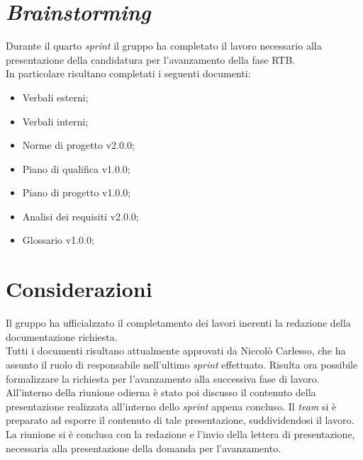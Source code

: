 \section{\textit{Brainstorming}}
Durante il quarto \textit{sprint} il gruppo ha completato il lavoro necessario alla presentazione della candidatura per l'avanzamento della fase RTB.\\
In particolare risultano completati i seguenti documenti:
\begin{itemize}
    \item Verbali esterni;
    \item Verbali interni;
    \item Norme di progetto v2.0.0;
    \item Piano di qualifica v1.0.0;
    \item Piano di progetto v1.0.0;
    \item Analisi dei requisiti v2.0.0;
    \item Glossario v1.0.0;
\end{itemize}

\section{Considerazioni}
Il gruppo ha ufficialzzato il completamento dei lavori inerenti la redazione della documentazione richiesta.\\
Tutti i documenti risultano attualmente approvati da Niccolò Carlesso, che ha assunto il ruolo di responsabile nell'ultimo \textit{sprint} effettuato.
Risulta ora possibile formalizzare la richiesta per l'avanzamento alla successiva fase di lavoro.\\
All'interno della riunione odierna è stato poi discusso il contenuto della presentazione realizzata all'interno dello \textit{sprint} appena concluso.
Il \textit{team} si è preparato ad esporre il contenuto di tale presentazione, suddividendosi il lavoro.\\
La riunione si è conclusa con la redazione e l'invio della lettera di presentazione, necessaria alla presentazione della domanda per l'avanzamento.